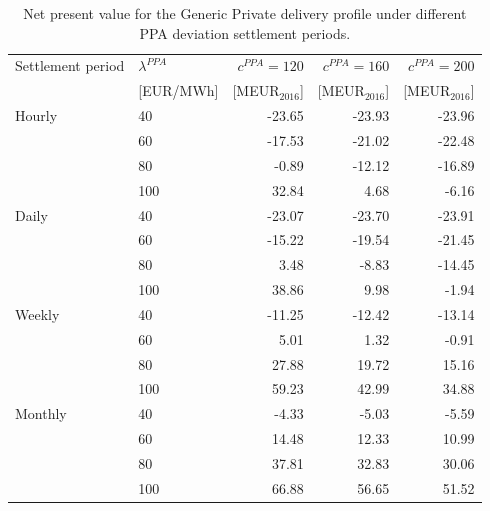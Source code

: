 \begin{table}[H]
\centering
\small
\caption{Net present value for the Generic Private delivery profile under different PPA deviation settlement periods.}
\label{tab:npv_generic_private}
\begin{tabular}{llrrr}
\toprule
Settlement period & $\lambda^{PPA}$ & $c^{PPA}=120$ & $c^{PPA}=160$ & $c^{PPA}=200$ \\
 & [EUR/MWh] & [MEUR$_{2016}$] & [MEUR$_{2016}$] & [MEUR$_{2016}$] \\
\midrule
Hourly & 40 & -23.65 & -23.93 & -23.96 \\
 & 60 & -17.53 & -21.02 & -22.48 \\
 & 80 & -0.89 & -12.12 & -16.89 \\
 & 100 & 32.84 & 4.68 & -6.16 \\
\addlinespace
Daily & 40 & -23.07 & -23.70 & -23.91 \\
 & 60 & -15.22 & -19.54 & -21.45 \\
 & 80 & 3.48 & -8.83 & -14.45 \\
 & 100 & 38.86 & 9.98 & -1.94 \\
\addlinespace
Weekly & 40 & -11.25 & -12.42 & -13.14 \\
 & 60 & 5.01 & 1.32 & -0.91 \\
 & 80 & 27.88 & 19.72 & 15.16 \\
 & 100 & 59.23 & 42.99 & 34.88 \\
\addlinespace
Monthly & 40 & -4.33 & -5.03 & -5.59 \\
 & 60 & 14.48 & 12.33 & 10.99 \\
 & 80 & 37.81 & 32.83 & 30.06 \\
 & 100 & 66.88 & 56.65 & 51.52 \\
\bottomrule
\end{tabular}
\end{table}

